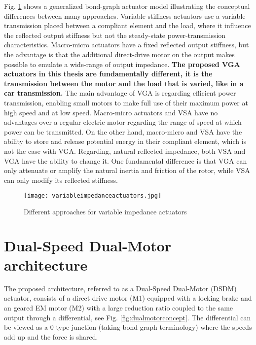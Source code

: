 Fig. \ref{fig:variableimpedanceactuators} shows a generalized bond-graph actuator model illustrating the conceptual differences between many approaches. Variable stiffness actuators use a variable transmission placed between a compliant element and the load, where it influence the reflected output stiffness but not the steady-state power-transmission characteristics. Macro-micro actuators have a fixed reflected output stiffness, but the advantage is that the additional direct-drive motor on the output makes possible to emulate a wide-range of output impedance. \textbf{The proposed VGA actuators in this thesis are fundamentally different, it is the transmission between the motor and the load that is varied, like in a car transmission.} The main advantage of VGA is regarding efficient power transmission, enabling small motors to make full use of their maximum power at high speed and at low speed. Macro-micro actuators and VSA have no advantages over a regular electric motor regarding the range of speed at which power can be transmitted. On the other hand, macro-micro and VSA have the ability to store and release potential energy in their compliant element, which is not the case with VGA. Regarding, natural reflected impedance, both VSA and VGA have the ability to change it. One fundamental difference is that VGA can only attenuate or amplify the natural inertia and friction of the rotor, while VSA can only modify its reflected stiffness. 

\begin{figure}[htp]
	\centering
		\texttt{[image: variableimpedanceactuators.jpg]}
	\caption{Different approaches for variable impedance actuators}
	\label{fig:variableimpedanceactuators}
\end{figure}





\newpage

\section{Dual-Speed Dual-Motor architecture}
\label{sec:DSDM}

The proposed architecture, referred to as a Dual-Speed Dual-Motor (DSDM) actuator, consists of a direct drive motor (M1) equipped with a locking brake and an geared EM motor (M2) with a large reduction ratio coupled to the same output through a differential, see Fig. \ref{fig:dualmotorconcept}. The differential can be viewed as a 0-type junction (taking bond-graph terminology) where the speeds add up and the force is shared. 


